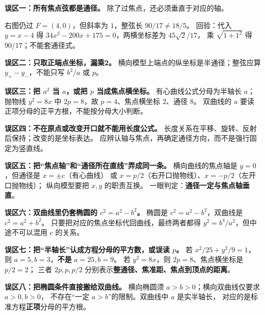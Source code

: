 \begin{trapbox}
\textbf{误区一：所有焦点弦都是通径。} 除了过焦点，还必须垂直于对应的轴。

右图仍过 $F=(4,0)$，但斜率为 $1$，整弦长 $90/17\ne18/5$。
回验：代入 $y=x-4$ 得 $34x^2-200x+175=0$，两横坐标差为 $45\sqrt2/17$，
乘 $\sqrt{1+1^2}$ 得 $90/17$；不能套通径式。

\medskip
\textbf{误区二：只取正端点坐标，漏乘2。}
横向模型上端点的纵坐标是半通径；整弦应算 $y_+-y_-$，不能只写 $b^2/a$ 或 $p$。

\medskip
\textbf{误区三：把 $a^2$ 当 $a$，或把 $p$ 当成焦点横坐标。}
有心曲线公式分母为半轴长 $a$；抛物线 $y^2=8x$ 中 $2p=8$，故 $p=4$、焦点横坐标 $2$、通径 $8$。
双曲线的 $a$ 要读正项分母的正平方根，不能按分母大小判断。

\medskip
\textbf{误区四：不在原点或改变开口就不能用长度公式。}
长度关系在平移、旋转、反射后保持；改变的是坐标表达。
应辨认轴与焦点，再确定通径方向，而不是强行固定为竖直线。


\medskip
\textbf{误区五：把“焦点轴”和“通径所在直线”弄成同一条。}
横向曲线的焦点轴是 $y=0$，但通径是 $x=\pm c$（有心曲线）
或 $x=p/2$（右开口抛物线）、$x=-p/2$（左开口抛物线）；
纵向模型要把 $x,y$ 的职责互换。
一眼判定：\textbf{通径一定与焦点轴垂直}。

\medskip
\textbf{误区六：双曲线里仍套椭圆的 $c^2=a^2-b^2$。}
椭圆是 $c^2=a^2-b^2$，双曲线是 $c^2=a^2+b^2$。
只要把对应的焦点坐标代回曲线，最终两者都得
$y^2=b^4/a^2$，但中途不可以混用 $c$ 的关系。

\medskip
\textbf{误区七：把“半轴长”认成方程分母的平方数，或误读 $p$。}
若 $x^2/25+y^2/9=1$，则 $a=5,b=3$，\textbf{不是} $a=25,b=9$。
若 $y^2=8x$，则 $2p=8$、焦点横坐标是 $p/2=2$；
三者 $2p,p,p/2$ 分别表示\textbf{整通径、焦准距、焦点到顶点的距离}。

\medskip
\textbf{误区八：把椭圆条件直接搬给双曲线。}
横向椭圆须 $a>b>0$；横向双曲线仅要求 $a>0,b>0$，
不存在“一定 $a>b$”的限制。双曲线中 $a$ 是实半轴长，
对应的是标准方程\textbf{正项}分母的平方根。

\end{trapbox}
